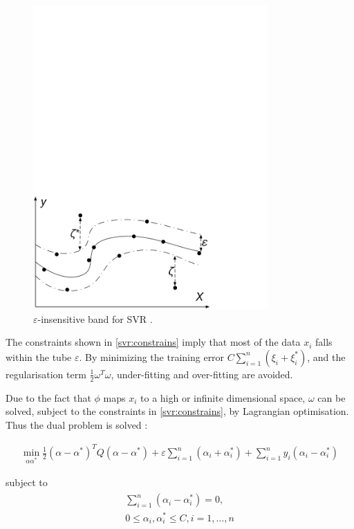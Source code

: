 \begin{figure}[b]
	\includegraphics[width=0.8\textwidth]{Chapter5/figures/Kell_eEnergy_Fig2.pdf}
	\caption{$\varepsilon$-insensitive band for SVR \cite{Shu2006}.}
	\label{fig:insensitive}
\end{figure}

The constraints shown in \eqref{svr:constrains} imply that most of the data $x_i$ falls within the tube $\varepsilon$. By minimizing the training error $C\sum_{i=1}^n(\xi_i+\xi_i^*)$, and the regularisation term $\frac{1}{2}\omega^T\omega$, under-fitting and over-fitting are avoided. 

Due to the fact that $\phi$ maps $x_i$ to a high or infinite dimensional space, $\omega$ can be solved, subject to the constraints in \eqref{svr:constrains}, by Lagrangian optimisation. Thus the dual problem is solved \cite{Shu2006,Chen2004,Smola2004}:

\begin{align}
\min_{\alpha\alpha^*}\frac{1}{2}(\alpha-\alpha^*)^TQ(\alpha-\alpha^*)+\varepsilon\sum^n_{i=1}(\alpha_i+\alpha_i^*)+\sum_{i=1}^ny_i(\alpha_i-\alpha_i^*)
\end{align}

\noindent subject to 
\begin{align}
\begin{multlined}
\sum_{i=1}^n(\alpha_i-\alpha_i^*)=0,\\
0\leq\alpha_i,\alpha^*_i\leq C,i=1,\ldots,n
\end{multlined}
\end{align}

